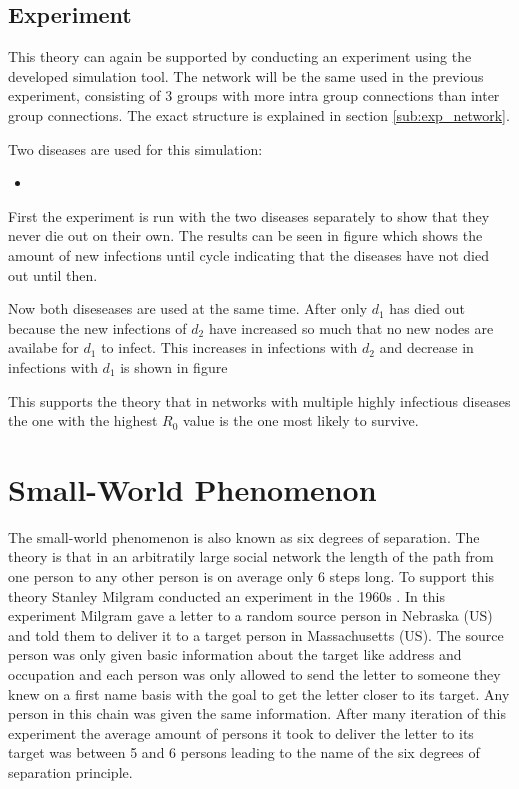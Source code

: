 \subsection{Experiment}
This theory can again be supported by conducting an experiment using the developed simulation
tool. The network will be the same used in the previous experiment, consisting of 3 groups with
more intra group connections than inter group connections. The exact structure is explained
in section \ref{sub:exp_network}.

Two diseases are used for this simulation:
\begin{itemize}
    \item %
\end{itemize}

First the experiment is run with the two diseases separately to show that they never die out
on their own. The results can be seen in figure %
which shows the amount of new infections until cycle %
indicating that the diseases have not died out until then.

Now both diseseases are used at the same time. After only %
$d_1$ has died out because the new infections of $d_2$ have increased so much that
no new nodes are availabe for $d_1$ to infect. This increases in infections with $d_2$ and
decrease in infections with $d_1$ is shown in figure %

This supports the theory that in networks with multiple highly infectious diseases the
one with the highest $R_0$ value is the one most likely to survive.

\section{Small-World Phenomenon}
The small-world phenomenon is also known as six degrees of separation. The theory is that
in an arbitratily large social network the length of the path from one person to any other
person is on average only 6 steps long. To support this theory Stanley Milgram conducted
an experiment in the 1960s \cite{smallWorld}. In this experiment Milgram gave a letter to 
a random source person in Nebraska (US) and told them to deliver it to a target person in
Massachusetts (US). The source person was only given basic information about the target like 
address and occupation and each person was only allowed to send the letter to someone they
knew on a first name basis with the goal to get the letter closer to its target. Any person
in this chain was given the same information. After many iteration of this experiment the 
average amount of persons it took to deliver the letter to its target was between 5 and 6 persons
leading to the name of the six degrees of separation principle.

